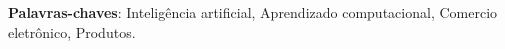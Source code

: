 \setlength{\absparsep}{18pt} %
\begin{resumo}

\textbf{Palavras-chaves}: Inteligência artificial, Aprendizado computacional, Comercio eletrônico, Produtos.
\end{resumo}